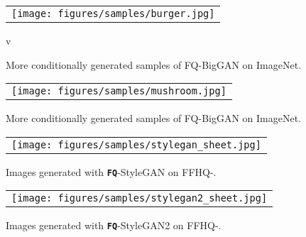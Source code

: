 \documentclass{article}
\begin{document}
\begin{figure*}[!t]\vspace{-0mm}\centering
	\begin{tabular}{c}
		\texttt{[image: figures/samples/burger.jpg]}  \\ 
\end{tabular}v
	\vspace{-0mm}
	\caption{More conditionally generated samples of FQ-BigGAN on ImageNet.}
	\vspace{-0mm}
	\label{fig:imagenet_sup_128_burger}
\end{figure*}
\begin{figure*}[!t]\vspace{-0mm}\centering
	\begin{tabular}{c}
\texttt{[image: figures/samples/mushroom.jpg]}  \\
\end{tabular}
	\vspace{-0mm}
	\caption{More conditionally generated samples of FQ-BigGAN on ImageNet.}
	\vspace{-0mm}
	\label{fig:imagenet_sup_128_mushroom}
\end{figure*}
\begin{figure*}[!t]\vspace{-0mm}\centering
	\begin{tabular}{c}
		\texttt{[image: figures/samples/stylegan\_sheet.jpg]}  \\
	\end{tabular}
	\vspace{-0mm}
	\caption{Images generated with \textbf{\texttt{FQ}}-StyleGAN on FFHQ-.}
	\vspace{-0mm}
	\label{fig:stylgean_sheet}
\end{figure*}
\begin{figure*}[!t]\vspace{-0mm}\centering
	\begin{tabular}{c}
		\texttt{[image: figures/samples/stylegan2\_sheet.jpg]}  \\
	\end{tabular}
	\vspace{-0mm}
	\caption{Images generated with \textbf{\texttt{FQ}}-StyleGAN2 on FFHQ-.}
	\vspace{-0mm}
	\label{fig:stylgean2_sheet}
\end{figure*}
\end{document}
